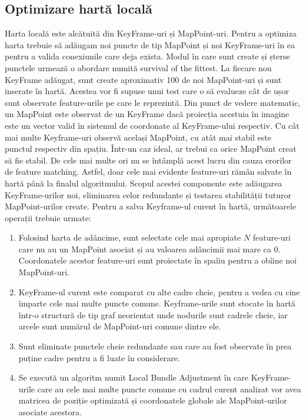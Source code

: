 \documentclass[12pt,a4paper]{report}
\begin{document}
\subsection{Optimizare hartă locală}
Harta locală este alcătuită din KeyFrame-uri și MapPoint-uri. Pentru a optimiza
harta trebuie să adăugam noi puncte de tip MapPoint și noi KeyFrame-uri în ea 
pentru a valida conexiunile care deja exista. Modul în care sunt create și șterse 
punctele urmează o abordare numită survival of the fittest. La fiecare nou KeyFrame 
adăugat, sunt create aproximativ 100 de noi MapPoint-uri și sunt inserate în hartă. Acestea
vor fi supuse unui test care o să evalueze cât de ușor sunt observate feature-urile pe care
le reprezintă. Din punct de vedere matematic, un MapPoint este observat de un KeyFrame
dacă proiecția acestuia în imagine este un vector valid în sistemul de coordonate 
al KeyFrame-ului respectiv. Cu cât mai multe Keyframe-uri observă același MapPoint,
cu atât mai stabil este punctul respectiv din spațiu. Într-un caz ideal, ar trebui ca
orice MapPoint creat să fie stabil. De cele mai multe ori nu se întâmplă acest lucru din
cauza erorilor de feature matching. Astfel, doar cele mai evidente feature-uri rămân 
salvate în hartă până la finalul algoritmului. Scopul acestei componente este adăugarea 
KeyFrame-urilor noi, eliminarea celor redundante și testarea stabilității tuturor MapPoint-urilor
create. Pentru a salva Keyframe-ul curent în hartă, următoarele operații trebuie urmate:
\begin{enumerate}
    \item Folosind harta de adâncime, sunt selectate cele mai apropiate \( N \) feature-uri 
    care nu au un MapPoint asociat și au valoarea adâncimii mai mare ca 0.
    Coordonatele acestor feature-uri sunt proiectate în spaîiu pentru a obîine noi MapPoint-uri.      
    \item KeyFrame-ul curent este comparat cu alte cadre cheie, pentru a vedea cu cine împarte 
    cele mai multe puncte comune. Keyframe-urile sunt stocate în hartă într-o structură de tip 
    graf neorientat unde nodurile sunt cadrele cheie, iar arcele sunt numărul de MapPoint-uri comune 
    dintre ele.
    \item Sunt eliminate punctele cheie redundante sau care au fost observate în prea puține 
    cadre pentru a fi luate în considerare.
    \item Se execută un algoritm numit Local Bundle Adjustment în care KeyFrame-urile 
    care au cele mai multe puncte comune cu cadrul curent analizat vor avea matricea de
    poziție optimizată și coordonatele globale ale MapPoint-urilor asociate acestora.
\end{enumerate} 
 
\end{document}

